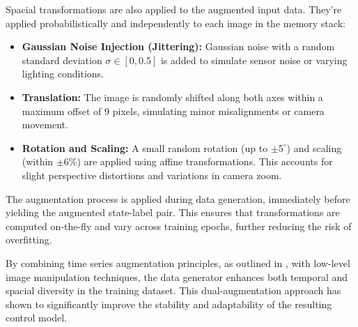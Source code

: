 Spacial transformations are also applied to the augmented input data. They're applied probabilistically and independently to each image in the memory stack:

\begin{itemize}
  \item \textbf{Gaussian Noise Injection (Jittering):} Gaussian noise with a random standard deviation \( \sigma \in [0, 0.5] \) is added to simulate sensor noise or varying lighting conditions.
  \item \textbf{Translation:} The image is randomly shifted along both axes within a maximum offset of 9 pixels, simulating minor misalignments or camera movement.
  \item \textbf{Rotation and Scaling:} A small random rotation (up to \( \pm 5^\circ \)) and scaling (within \( \pm 6\% \)) are applied using affine transformations. This accounts for slight perspective distortions and variations in camera zoom.
\end{itemize}

The augmentation process is applied during data generation, immediately before yielding the augmented state-label pair. This ensures that transformations are computed on-the-fly and vary across training epochs, further reducing the risk of overfitting.

By combining time series augmentation principles, as outlined in \autocite{iglesias2023data}, with low-level image manipulation techniques, the data generator enhances both temporal and spacial diversity in the training dataset. This dual-augmentation approach has shown to significantly improve the stability and adaptability of the resulting control model.

